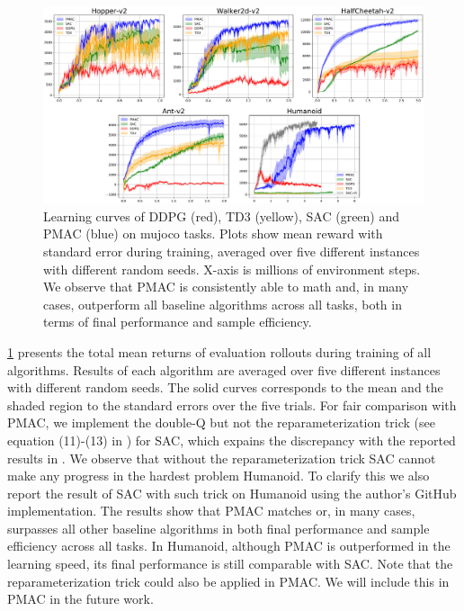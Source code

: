 \begin{figure}[t]
\begin{center}
\includegraphics[width=0.8\linewidth]{./mujoco-results.pdf}
\end{center}
\caption{
Learning curves of DDPG (red), TD3 (yellow), SAC (green) and PMAC (blue) on mujoco tasks. Plots show mean reward with standard error during training, averaged over five different instances with different random seeds. X-axis is millions of environment steps. We observe that PMAC is consistently able to math and, in many cases, outperform all baseline algorithms across all tasks, both in terms of final performance and sample efficiency. }
\label{fig:result-mujoco} 
\end{figure}

\cref{fig:result-mujoco} presents the total mean returns of evaluation rollouts during training of all algorithms. Results of each algorithm are averaged over five different instances with different random seeds. The solid curves corresponds to the mean and the shaded region to the standard errors over the five trials. For fair comparison with PMAC, we implement the double-Q but not the reparameterization trick (see equation (11)-(13) in \citep{haarnoja2018soft}) for SAC, which expains the discrepancy with the reported results in \citep{haarnoja2018soft}. We observe that without the reparameterization trick SAC cannot make any progress in the hardest problem Humanoid. To clarify this we also report the result of SAC with such trick on Humanoid using the author's GitHub implementation. The results show that PMAC matches or, in many cases, surpasses all other baseline algorithms in both final performance and sample efficiency across all tasks. In Humanoid, although PMAC is outperformed in the learning speed, its final performance is still comparable with SAC. Note that the reparameterization trick could also be applied in PMAC. We will include this in PMAC in the future work.




